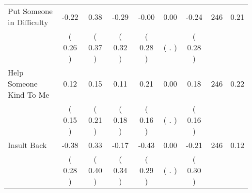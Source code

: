 \begin{tabular}{lcccccccc}
Put Someone in Difficulty &     -0.22 &      0.38 &     -0.29 &     -0.00 &      0.00 &     -0.24 & 246 &       0.21 \\ 
 & (     0.26 ) & (     0.37 ) & (     0.32 ) & (     0.28 ) & (        . ) & (     0.28 ) & \\
Help Someone Kind To Me &      0.12 &      0.15 &      0.11 &      0.21 &      0.00 &      0.18 & 246 &       0.22 \\ 
 & (     0.15 ) & (     0.21 ) & (     0.18 ) & (     0.16 ) & (        . ) & (     0.16 ) & \\
Insult Back &     -0.38 &      0.33 &     -0.17 &     -0.43 &      0.00 &     -0.21 & 246 &       0.12 \\ 
 & (     0.28 ) & (     0.40 ) & (     0.34 ) & (     0.29 ) & (        . ) & (     0.30 ) & \\
\bottomrule
\end{tabular}
